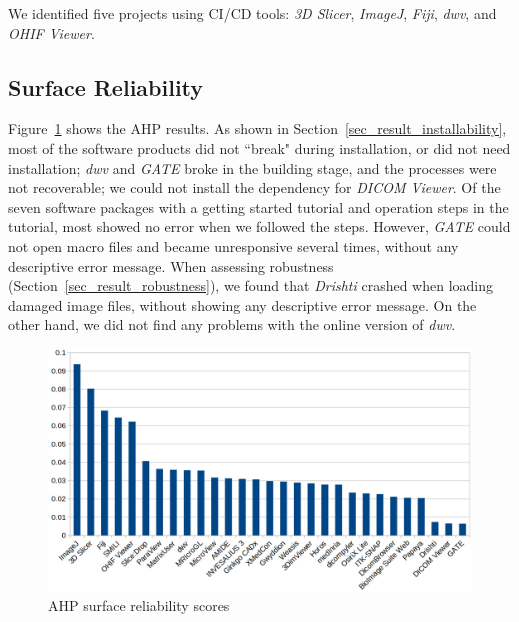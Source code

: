 \documentclass[final, 3p, times, authoryear]{elsarticle}
\begin{document}
We identified five projects using CI/CD tools: \textit{3D Slicer},
\textit{ImageJ}, \textit{Fiji}, \textit{dwv}, and \textit{OHIF Viewer}.


\subsection{Surface Reliability} \label{sec_result_reliability}

Figure~\ref{fg_reliability_scores} shows the AHP results.  As shown in
Section~\ref{sec_result_installability}, most of the software products did not
``break" during installation, or did not need installation; \textit{dwv} and
\textit{GATE} broke in the building stage, and the processes were not
recoverable; we could not install the dependency for \textit{DICOM Viewer}. Of
the seven software packages with a getting started tutorial and operation steps
in the tutorial, most showed no error when we followed the steps. However,
\textit{GATE} could not open macro files and became unresponsive several times,
without any descriptive error message. When assessing robustness
(Section~\ref{sec_result_robustness}), we found that \textit{Drishti} crashed
when loading damaged image files, without showing any descriptive error message.
On the other hand, we did not find any problems with the online version of
\textit{dwv}.

\begin{figure}[ht]
\includegraphics[scale=0.38]{figures/reliability_scores.png}
\caption{AHP surface reliability scores}
\label{fg_reliability_scores}
\end{figure}
\end{document}
